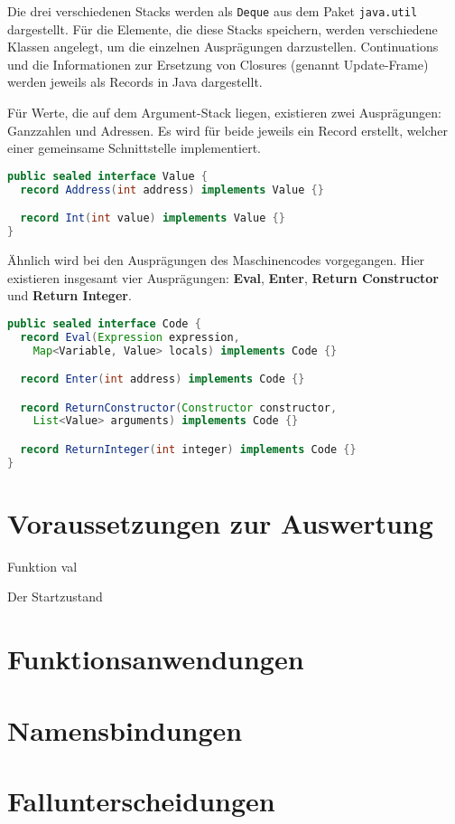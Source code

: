 Die drei verschiedenen Stacks werden als \texttt{Deque} aus dem Paket \texttt{java.util} dargestellt.
Für die Elemente, die diese Stacks speichern, werden verschiedene Klassen angelegt, um die einzelnen Ausprägungen darzustellen.
Continuations und die Informationen zur Ersetzung von Closures (genannt Update-Frame) werden jeweils als Records in Java dargestellt.

Für Werte, die auf dem Argument-Stack liegen, existieren zwei Ausprägungen: Ganzzahlen und Adressen.
Es wird für beide jeweils ein Record erstellt, welcher einer gemeinsame Schnittstelle implementiert.

\begin{lstlisting}[language=java, morekeywords={record, sealed}, caption={Darstellung von Werten in Java}, label={lst:value}]
public sealed interface Value {
  record Address(int address) implements Value {}

  record Int(int value) implements Value {}
}
\end{lstlisting}

Ähnlich wird bei den Ausprägungen des Maschinencodes vorgegangen.
Hier existieren insgesamt vier Ausprägungen: \textbf{Eval}, \textbf{Enter}, \textbf{Return Constructor} und \textbf{Return Integer}.


\begin{lstlisting}[language=java, morekeywords={record, sealed}, caption={Darstellung der Ausprägungen des Maschinencodes in Java}, label={lst:code}]
public sealed interface Code {
  record Eval(Expression expression,
    Map<Variable, Value> locals) implements Code {}

  record Enter(int address) implements Code {}

  record ReturnConstructor(Constructor constructor,
    List<Value> arguments) implements Code {}

  record ReturnInteger(int integer) implements Code {}
}
\end{lstlisting}


\section{Voraussetzungen zur Auswertung}

Funktion val

Der Startzustand


\section{Funktionsanwendungen}


\section{Namensbindungen}


\section{Fallunterscheidungen}




